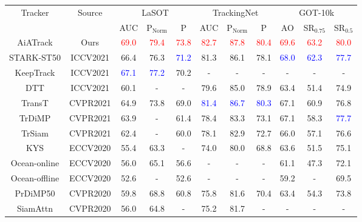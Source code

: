 \begin{table}[t]
\centering
\begin{tabular}{c|c|ccc|ccc|ccc}
\hline
\multirow{2}{*}{Tracker}
& \multirow{2}{*}{Source}
& \multicolumn{3}{c|}{LaSOT \cite{fan2019lasot}}
& \multicolumn{3}{c|}{TrackingNet \cite{muller2018trackingnet}}
& \multicolumn{3}{c}{GOT-10k \cite{huang2019got}} \\
& & AUC & P$_{\text{Norm}}$ & \multicolumn{1}{c|}{P}
& AUC & P$_{\text{Norm}}$ & \multicolumn{1}{c|}{P}
& AO & SR$_{0.75}$ & SR$_{0.5}$ \\
\hline
AiATrack & Ours & 
\textcolor{red}{69.0} & \textcolor{red}{79.4} & \textcolor{red}{73.8} & 
\textcolor{red}{82.7} & \textcolor{red}{87.8} & \textcolor{red}{80.4} & 
\textcolor{red}{69.6} & \textcolor{red}{63.2} & \textcolor{red}{80.0} \\
STARK-ST50 \cite{yan2021learning} & ICCV2021 & 
66.4 & 76.3 & \textcolor{blue}{71.2} & 81.3 & 86.1 & 78.1 & \textcolor{blue}{68.0} & \textcolor{blue}{62.3} & \textcolor{blue}{77.7} \\
KeepTrack \cite{mayer2021learning} & ICCV2021 & 
\textcolor{blue}{67.1} & \textcolor{blue}{77.2} & 70.2 & - & - & - & - & - & - \\
DTT \cite{yu2021high} & ICCV2021 & 
60.1 & - & - & 79.6 & 85.0 & 78.9 & 63.4 & 51.4 & 74.9 \\
TransT \cite{chen2021transformer} & CVPR2021 & 
64.9 & 73.8 & 69.0 & \textcolor{blue}{81.4} & \textcolor{blue}{86.7} & \textcolor{blue}{80.3} & 67.1 & 60.9 & 76.8 \\
TrDiMP \cite{wang2021transformer} & CVPR2021 & 
63.9 & - & 61.4 & 78.4 & 83.3 & 73.1 & 67.1 & 58.3 & \textcolor{blue}{77.7} \\
TrSiam \cite{wang2021transformer} & CVPR2021 & 
62.4 & - & 60.0 & 78.1 & 82.9 & 72.7 & 66.0 & 57.1 & 76.6 \\
KYS \cite{bhat2020know} & ECCV2020 & 
55.4 & 63.3 & - & 74.0 & 80.0 & 68.8 & 63.6 & 51.5 & 75.1 \\
Ocean-online \cite{zhang2020ocean} & ECCV2020 & 
56.0 & 65.1 & 56.6 & - & - & - & 61.1 & 47.3 & 72.1 \\
Ocean-offline \cite{zhang2020ocean} & ECCV2020 & 
52.6 & - & 52.6 & - & - & - & 59.2 & - & 69.5 \\
PrDiMP50 \cite{danelljan2020probabilistic} & CVPR2020 & 
59.8 & 68.8 & 60.8 & 75.8 & 81.6 & 70.4 & 63.4 & 54.3 & 73.8 \\
SiamAttn \cite{yu2020deformable} & CVPR2020 & 
56.0 & 64.8 & - & 75.2 & 81.7 & - & - & - & - \\

\end{tabular}
\end{table}
